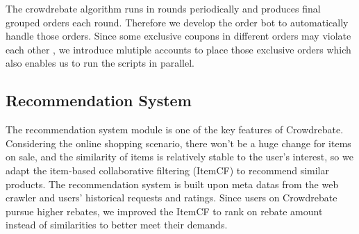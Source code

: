  The crowdrebate algorithm runs in rounds periodically and produces final grouped orders each round. Therefore we develop the order bot to automatically handle those orders. Since some exclusive coupons in different orders may violate each other , we introduce mlutiple accounts to place  those exclusive orders which also enables us to run the scripts in parallel.

\subsection{Recommendation System}

The recommendation system module is one of the key features of Crowdrebate. Considering the online shopping scenario, there won't be a huge change for items on sale, and the similarity of items is relatively stable to the user’s interest, so we adapt the item-based collaborative filtering (ItemCF) to recommend similar products. The recommendation system is built upon meta datas from the web crawler and users' historical requests and ratings. Since users on Crowdrebate pursue higher rebates, we improved the ItemCF to rank on rebate amount instead of similarities to better meet their demands. 